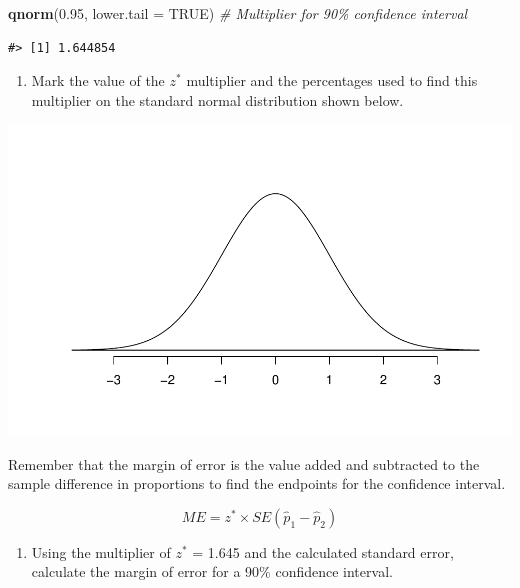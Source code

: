 \documentclass[
]{report}
\newenvironment{Shaded}{\begin{snugshade}}{\end{snugshade}}
\newcommand{\AttributeTok}[1]{\textcolor[rgb]{0.13,0.29,0.53}{#1}}
\newcommand{\CommentTok}[1]{\textcolor[rgb]{0.56,0.35,0.01}{\textit{#1}}}
\newcommand{\ConstantTok}[1]{\textcolor[rgb]{0.56,0.35,0.01}{#1}}
\newcommand{\FloatTok}[1]{\textcolor[rgb]{0.00,0.00,0.81}{#1}}
\newcommand{\FunctionTok}[1]{\textcolor[rgb]{0.13,0.29,0.53}{\textbf{#1}}}
\newcommand{\NormalTok}[1]{#1}
\providecommand{\tightlist}{%
  \setlength{\itemsep}{0pt}\setlength{\parskip}{0pt}}
\begin{document}
\begin{Shaded}
\begin{Highlighting}[]
\FunctionTok{qnorm}\NormalTok{(}\FloatTok{0.95}\NormalTok{, }\AttributeTok{lower.tail =} \ConstantTok{TRUE}\NormalTok{) }\CommentTok{\# Multiplier for 90\% confidence interval}
\end{Highlighting}
\end{Shaded}

\begin{verbatim}
#> [1] 1.644854
\end{verbatim}

\begin{enumerate}
\def\labelenumi{\arabic{enumi}.}
\setcounter{enumi}{11}
\tightlist
\item
  Mark the value of the \(z^*\) multiplier and the percentages used to find this multiplier on the standard normal distribution shown below.
\end{enumerate}

\begin{center}\includegraphics[width=0.45\linewidth]{09-A20-inference-2cat-CIs_files/figure-latex/standNormc-1} \end{center}

\vspace{1mm}

\newpage

Remember that the margin of error is the value added and subtracted to the sample difference in proportions to find the endpoints for the confidence interval.

\[ME = z^*\times SE(\hat{p}_1 - \hat{p}_2)\]

\begin{enumerate}
\def\labelenumi{\arabic{enumi}.}
\setcounter{enumi}{12}
\tightlist
\item
  Using the multiplier of \(z^*\) = 1.645 and the calculated standard error, calculate the margin of error for a 90\% confidence interval.
\end{enumerate}

\vspace{0.8in}
\end{document}
